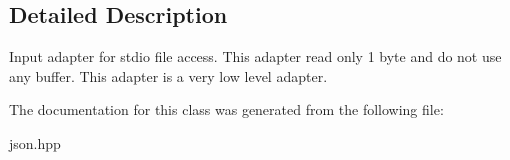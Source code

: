 \subsection{Detailed Description}
Input adapter for stdio file access. This adapter read only 1 byte and do not use any buffer. This adapter is a very low level adapter. 

The documentation for this class was generated from the following file\+:\begin{DoxyCompactItemize}
\item 
json.\+hpp\end{DoxyCompactItemize}
